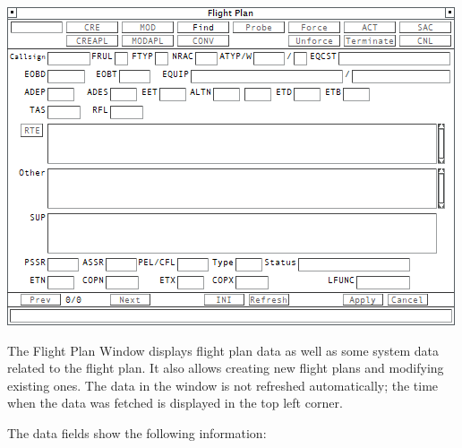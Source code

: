 \documentclass[11pt,a4paper]{memoir}
\begin{document}
\includegraphics{img/fpl.png}

The Flight Plan Window displays flight plan data as well as some system data related to the flight plan. It also allows creating new flight plans and modifying existing ones. The data in the window is not refreshed automatically; the time when the data was fetched is displayed in the top left corner.

The data fields show the following information:
\end{document}
